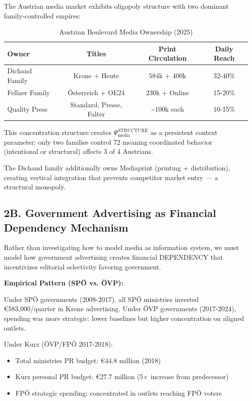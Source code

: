 The Austrian media market exhibits oligopoly structure with two dominant family-controlled empires:

\begin{table}[h]
\centering
\caption{Austrian Boulevard Media Ownership (2025)}
\label{tab:dx-media-ownership}
\begin{tabular}{|l|c|c|c|}
\hline
\textbf{Owner} & \textbf{Titles} & \textbf{Print Circulation} & \textbf{Daily Reach} \\
\hline
Dichand Family & Krone + Heute & 584k + 400k & 32-40\% \\
Fellner Family & Österreich + OE24 & 230k + Online & 15-20\% \\
Quality Press & Standard, Presse, Falter & \textasciitilde 100k each & 10-15\% \\
\hline
\end{tabular}
\end{table}

This concentration structure creates $\Psi_{\text{media}}^{\text{STRUCTURE}}$ as a
persistent context parameter: only two families control 72%
meaning coordinated behavior (intentional or structural) affects 3 of 4 Austrians.

The Dichand family additionally owns Mediaprint (printing + distribution), creating
vertical integration that prevents competitor market entry — a structural monopoly.

\subsection*{2B. Government Advertising as Financial Dependency Mechanism}

Rather than investigating how to model media as information system, we must model
how government advertising creates financial DEPENDENCY that incentivizes
editorial selectivity favoring government.

\textbf{Empirical Pattern (SPÖ vs. ÖVP):}

Under SPÖ governments (2008-2017), all SPÖ ministries invested €583,000/quarter
in Krone advertising. Under ÖVP governments (2017-2024), spending was more
strategic: lower baselines but higher concentration on aligned outlets.

Under Kurz (ÖVP/FPÖ 2017-2018):
\begin{itemize}
\item Total ministries PR budget: €44.8 million (2018)
\item Kurz personal PR budget: €27.7 million (5× increase from predecessor)
\item FPÖ strategic spending: concentrated in outlets reaching FPÖ voters
\end{itemize}

